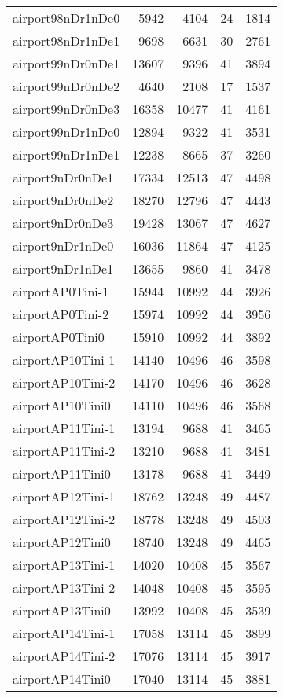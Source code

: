 \begin{tabular}{lrrrr}
airport98nDr1nDe0 & 5942 & 4104 & 24 & 1814 \\
airport98nDr1nDe1 & 9698 & 6631 & 30 & 2761 \\
airport99nDr0nDe1 & 13607 & 9396 & 41 & 3894 \\
airport99nDr0nDe2 & 4640 & 2108 & 17 & 1537 \\
airport99nDr0nDe3 & 16358 & 10477 & 41 & 4161 \\
airport99nDr1nDe0 & 12894 & 9322 & 41 & 3531 \\
airport99nDr1nDe1 & 12238 & 8665 & 37 & 3260 \\
airport9nDr0nDe1 & 17334 & 12513 & 47 & 4498 \\
airport9nDr0nDe2 & 18270 & 12796 & 47 & 4443 \\
airport9nDr0nDe3 & 19428 & 13067 & 47 & 4627 \\
airport9nDr1nDe0 & 16036 & 11864 & 47 & 4125 \\
airport9nDr1nDe1 & 13655 & 9860 & 41 & 3478 \\
airportAP0Tini-1 & 15944 & 10992 & 44 & 3926 \\
airportAP0Tini-2 & 15974 & 10992 & 44 & 3956 \\
airportAP0Tini0 & 15910 & 10992 & 44 & 3892 \\
airportAP10Tini-1 & 14140 & 10496 & 46 & 3598 \\
airportAP10Tini-2 & 14170 & 10496 & 46 & 3628 \\
airportAP10Tini0 & 14110 & 10496 & 46 & 3568 \\
airportAP11Tini-1 & 13194 & 9688 & 41 & 3465 \\
airportAP11Tini-2 & 13210 & 9688 & 41 & 3481 \\
airportAP11Tini0 & 13178 & 9688 & 41 & 3449 \\
airportAP12Tini-1 & 18762 & 13248 & 49 & 4487 \\
airportAP12Tini-2 & 18778 & 13248 & 49 & 4503 \\
airportAP12Tini0 & 18740 & 13248 & 49 & 4465 \\
airportAP13Tini-1 & 14020 & 10408 & 45 & 3567 \\
airportAP13Tini-2 & 14048 & 10408 & 45 & 3595 \\
airportAP13Tini0 & 13992 & 10408 & 45 & 3539 \\
airportAP14Tini-1 & 17058 & 13114 & 45 & 3899 \\
airportAP14Tini-2 & 17076 & 13114 & 45 & 3917 \\
airportAP14Tini0 & 17040 & 13114 & 45 & 3881 \\

\end{tabular}

